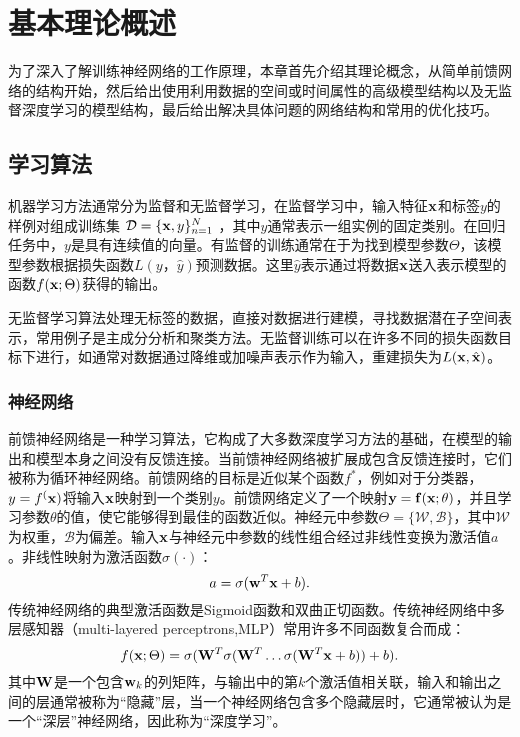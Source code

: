 \chapter{基本理论概述}
\label{chap:basicknowledge}
 
为了深入了解训练神经网络的工作原理，本章首先介绍其理论概念，从简单前馈网络的结构开始，然后给出使用利用数据的空间或时间属性的高级模型结构以及无监督深度学习的模型结构，最后给出解决具体问题的网络结构和常用的优化技巧。

\section{学习算法}

机器学习方法通​​常分为监督和无监督学习，在监督学习中，输入特征${\bf x} $和标签$y$的样例对组成训练集
$\mathcal{D} = \{{\bf x}, y\}^{N}_{n = 1}$ ，其中$y$通常表示一组实例的固定类别。在回归任务中，$y$是具有连续值的向量。有监督的训练通常在于为找到模型参数$\Theta$，该模型参数根据损失函数$L(y，\hat{y})$预测数据。这里$\hat{y}$表示通过将数据${\bf x}$送入表示模型的函数$f({\bf x}; \Theta)$获得的输出。

无监督学习算法处理无标签的数据，直接对数据进行建模，寻找数据潜在子空间表示，常用例子是主成分分析和聚类方法。无监督训练可以在许多不同的损失函数目标下进行，如通常对数据通过降维或加噪声表示作为输入，重建损失为$L({\bf x}, \hat{{\bf x}})$。

\subsection{神经网络}

前馈神经网络是一种学习算法，它构成了大多数深度学习方法的基础，在模型的输出和模型本身之间没有反馈连接。当前馈神经网络被扩展成包含反馈连接时，它们被称为循环神经网络。前馈网络的目标是近似某个函数$f^*$，例如对于分类器，$y = f^(\bf x)$将输入$\bf x$映射到一个类别$y$。前馈网络定义了一个映射$\bf y = f( \bf x; \theta)$，并且学习参数$\theta$的值，使它能够得到最佳的函数近似。神经元中参数$\Theta = \{\mathcal{W}, \mathcal{B}\}$，其中$\mathcal{W}$为权重，$\mathcal{B}$为偏差。输入${\bf x}$与神经元中参数的线性组合经过非线性变换为激活值$a$。非线性映射为激活函数$\sigma(\cdot)$： 
\begin{equation}
 a = \sigma({\bf w}^{T}{\bf x} + b).
\end{equation}
传统神经网络的典型激活函数是Sigmoid函数和双曲正切函数。传统神经网络中多层感知器（multi-layered perceptrons,MLP）常用许多不同函数复合而成：
\begin{equation}
 	f({\bf x}; \Theta) = \sigma( {\bf W}^{T}\sigma({\bf W}^{T} \ldots \sigma({\bf W}^{T} {\bf x} + b)  ) + b).
 \end{equation}
其中${\bf W}$是一个包含${\bf w}_{k}$的列矩阵，与输出中的第$k$个激活值相关联，输入和输出之间的层通常被称为“隐藏”层，当一个神经网络包含多个隐藏层时，它通常被认为是一个“深层”神经网络，因此称为“深度学习”。

